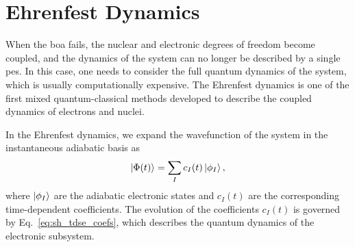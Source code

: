 \section{Ehrenfest Dynamics}\label{sec:ehrenfest_dynamics}
When the \gls{boa} fails, the nuclear and electronic degrees of freedom become coupled, and the dynamics of the system can no longer be described by a single \gls{pes}. In this case, one needs to consider the full quantum dynamics of the system, which is usually computationally expensive. The Ehrenfest dynamics is one of the first mixed quantum-classical methods developed to describe the coupled dynamics of electrons and nuclei.\supercite{10.1007/BF01329203}

In the Ehrenfest dynamics, we expand the wavefunction of the system in the instantaneous adiabatic basis as
\begin{equation}
\ket{\Phi(t)}=\sum_I c_I(t)\ket{\phi_I},
\end{equation}
where $\ket{\phi_I}$ are the adiabatic electronic states and $c_I(t)$ are the corresponding time-dependent coefficients. The evolution of the coefficients $c_I(t)$ is governed by Eq.~\eqref{eq:sh_tdse_coefs}, which describes the quantum dynamics of the electronic subsystem.

